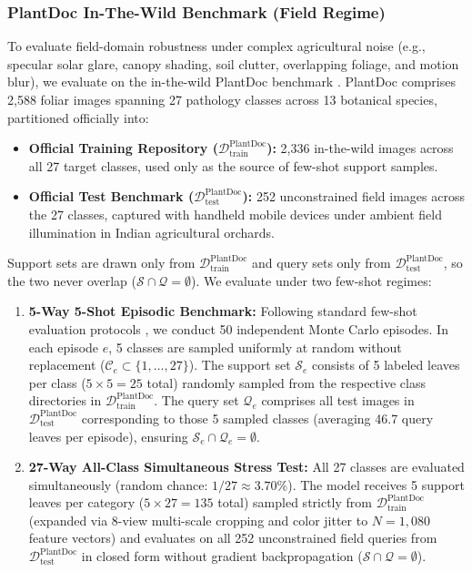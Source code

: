 \documentclass[preprint,12pt]{elsarticle}
\begin{document}
\subsubsection{PlantDoc In-The-Wild Benchmark (Field Regime)}
To evaluate field-domain robustness under complex agricultural noise (e.g., specular solar glare, canopy shading, soil clutter, overlapping foliage, and motion blur), we evaluate on the in-the-wild PlantDoc benchmark \cite{singh2020plantdoc}. PlantDoc comprises 2,588 foliar images spanning 27 pathology classes across 13 botanical species, partitioned officially into:
\begin{itemize}
    \item \textbf{Official Training Repository ($\mathcal{D}_{\text{train}}^{\text{PlantDoc}}$):} 2,336 in-the-wild images across all 27 target classes, used only as the source of few-shot support samples.
    \item \textbf{Official Test Benchmark ($\mathcal{D}_{\text{test}}^{\text{PlantDoc}}$):} 252 unconstrained field images across the 27 classes, captured with handheld mobile devices under ambient field illumination in Indian agricultural orchards.
\end{itemize}
Support sets are drawn only from $\mathcal{D}_{\text{train}}^{\text{PlantDoc}}$ and query sets only from $\mathcal{D}_{\text{test}}^{\text{PlantDoc}}$, so the two never overlap ($\mathcal{S} \cap \mathcal{Q} = \emptyset$). We evaluate under two few-shot regimes:
\begin{enumerate}
    \item \textbf{5-Way 5-Shot Episodic Benchmark:} Following standard few-shot evaluation protocols \cite{snell2017prototypical,zhou2026vsf}, we conduct 50 independent Monte Carlo episodes. In each episode $e$, 5 classes are sampled uniformly at random without replacement ($\mathcal{C}_e \subset \{1, \dots, 27\}$). The support set $\mathcal{S}_e$ consists of 5 labeled leaves per class ($5 \times 5 = 25$ total) randomly sampled from the respective class directories in $\mathcal{D}_{\text{train}}^{\text{PlantDoc}}$. The query set $\mathcal{Q}_e$ comprises all test images in $\mathcal{D}_{\text{test}}^{\text{PlantDoc}}$ corresponding to those 5 sampled classes (averaging 46.7 query leaves per episode), ensuring $\mathcal{S}_e \cap \mathcal{Q}_e = \emptyset$.
    \item \textbf{27-Way All-Class Simultaneous Stress Test:} All 27 classes are evaluated simultaneously (random chance: $1/27 \approx 3.70\%$). The model receives 5 support leaves per category ($5 \times 27 = 135$ total) sampled strictly from $\mathcal{D}_{\text{train}}^{\text{PlantDoc}}$ (expanded via 8-view multi-scale cropping and color jitter to $N = 1{,}080$ feature vectors) and evaluates on all 252 unconstrained field queries from $\mathcal{D}_{\text{test}}^{\text{PlantDoc}}$ in closed form without gradient backpropagation ($\mathcal{S} \cap \mathcal{Q} = \emptyset$).
\end{enumerate}
\end{document}
